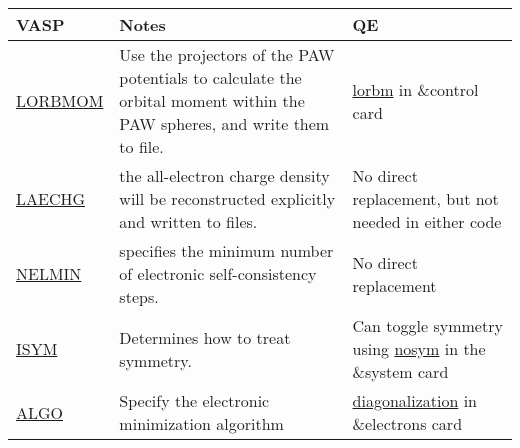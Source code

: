 \documentclass[12pt]{article}
\begin{document}
\newpage
\begin{center}
\begin{table}[ht]
\begin{tabularx}{\linewidth}{|>{\RaggedRight}p{2.5cm}|x|x|}\hline
 VASP  & Notes & QE \\ \hline

 \href{https://www.vasp.at/wiki/index.php/LORBMOM}{LORBMOM} &
 Use the projectors of the PAW potentials to calculate the orbital moment within the PAW spheres, and write them to file. &
 \href{https://www.quantum-espresso.org/Doc/INPUT_PW.html#idm128}{lorbm} in \&control card \\ \hline
 
 \href{https://www.vasp.at/wiki/index.php/LAECHG}{LAECHG} &
 the all-electron charge density will be reconstructed explicitly and written to files. &
 No direct replacement, but not needed in either code \\ \hline
 
 \href{https://www.vasp.at/wiki/index.php/NELMIN}{NELMIN} &
 specifies the minimum number of electronic self-consistency steps. &
 No direct replacement \\ \hline
 
 \href{https://www.vasp.at/wiki/index.php/ISYM}{ISYM} &
 Determines how to treat symmetry. &
 Can toggle symmetry using \href{https://www.quantum-espresso.org/Doc/INPUT_PW.html#idm768}{nosym} in the \&system card \\ \hline
 
 \href{https://www.vasp.at/wiki/index.php/ALGO}{ALGO} &
 Specify the electronic minimization algorithm &
 \href{https://www.quantum-espresso.org/Doc/INPUT_PW.html#idm768}{diagonalization} in \&electrons card \\ \hline

\end{tabularx}
\end{table}
\end{center}
\end{document}

